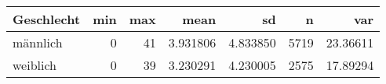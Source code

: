 
\begin{tabular}{lrrrrrr}
\toprule
Geschlecht & min & max & mean & sd & n & var\\
\midrule
männlich & 0 & 41 & 3.931806 & 4.833850 & 5719 & 23.36611\\
weiblich & 0 & 39 & 3.230291 & 4.230005 & 2575 & 17.89294\\
\bottomrule
\end{tabular}